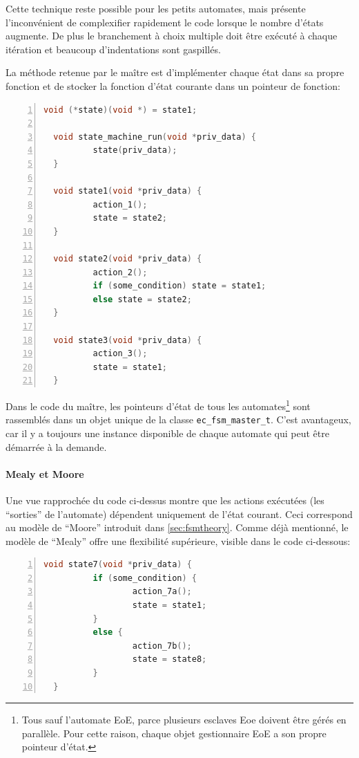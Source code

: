 \documentclass[a4paper,12pt,BCOR=6mm,bibtotoc,idxtotoc]{scrbook}
\begin{document}
Cette technique reste possible pour les petits automates, mais
pr\'esente l'inconv\'enient de complexifier rapidement le code lorsque
le nombre d'\'etats augmente. De plus le branchement \`a choix
multiple doit \^etre ex\'ecut\'e \`a chaque it\'eration et beaucoup
d'indentations sont gaspill\'es.

La m\'ethode retenue par le ma\^itre est d'impl\'ementer chaque \'etat
dans sa propre fonction et de stocker la fonction d'\'etat courante
dans un pointeur de fonction:

\begin{lstlisting}[gobble=2,language=C,numbers=left]
  void (*state)(void *) = state1;

  void state_machine_run(void *priv_data) {
          state(priv_data);
  }

  void state1(void *priv_data) {
          action_1();
          state = state2;
  }

  void state2(void *priv_data) {
          action_2();
          if (some_condition) state = state1;
          else state = state2;
  }

  void state3(void *priv_data) {
          action_3();
          state = state1;
  }
\end{lstlisting}

Dans le code du ma\^itre, les pointeurs d'\'etat de tous les
automates\footnote{Tous sauf l'automate EoE, parce plusieurs esclaves
  Eoe doivent \^etre g\'er\'es en parall\`ele.  Pour cette raison,
  chaque objet gestionnaire EoE a son propre pointeur d'\'etat.}  sont
rassembl\'es dans un objet unique de la classe
\lstinline+ec_fsm_master_t+.  C'est avantageux, car il y a toujours
une instance disponible de chaque automate qui peut \^etre d\'emarr\'ee
\`a la demande.

\paragraph{Mealy et Moore}

Une vue rapproch\'ee du code ci-dessus montre que les actions ex\'ecut\'ees
(les ``sorties'' de l'automate) d\'ependent uniquement de l'\'etat
courant.  Ceci correspond au mod\`ele de ``Moore'' introduit dans
\autoref{sec:fsmtheory}.  Comme d\'ej\`a mentionn\'e, le mod\`ele de ``Mealy''
offre une flexibilit\'e sup\'erieure, visible dans le code
ci-dessous:

\begin{lstlisting}[gobble=2,language=C,numbers=left]
  void state7(void *priv_data) {
          if (some_condition) {
                  action_7a();
                  state = state1;
          }
          else {
                  action_7b();
                  state = state8;
          }
  }
\end{lstlisting}
\end{document}
